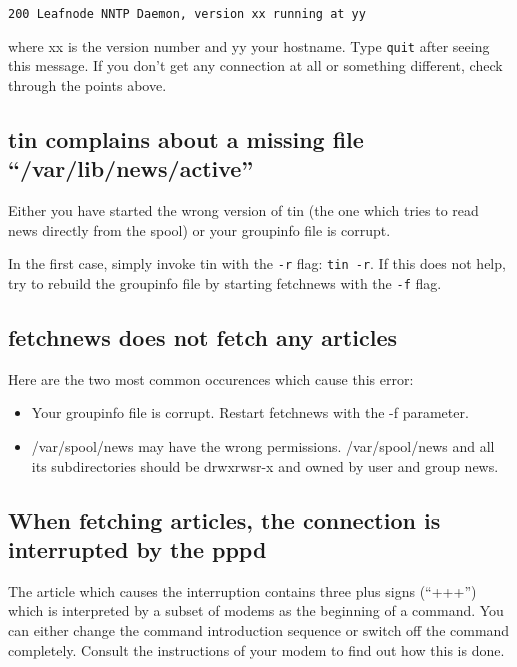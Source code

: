 \documentclass[10pt,english,a5paper]{article}
\begin{document}
   \begin{verbatim}
200 Leafnode NNTP Daemon, version xx running at yy
\end{verbatim}

   where xx is the version number and yy your hostname. Type \verb"quit" after
   seeing this message. If you don't get any connection at all or
   something different, check through the points above.


\subsection{tin complains about a missing file ``/var/lib/news/active''}

   Either you have started the wrong version of tin (the one which tries
   to read news directly from the spool) or your groupinfo file is
   corrupt.

   In the first case, simply invoke tin with the \verb+-r+ flag: \verb"tin -r". If
   this does not help, try to rebuild the groupinfo file by starting
   fetchnews with the \verb+-f+ flag.

   \subsection{fetchnews does not fetch any articles}

   Here are the two most common occurences which cause this error:
   \begin{itemize}
       \item Your groupinfo file is corrupt. Restart fetchnews with the -f
       parameter.
   \item /var/spool/news may have the wrong permissions. /var/spool/news
       and all its subdirectories should be drwxrwsr-x and owned by user
       and group news.
       \end{itemize}

\subsection{When fetching articles, the connection is interrupted by
the pppd}

   The article which causes the interruption contains three plus signs
   (``+++'') which is interpreted by a subset of modems as the beginning of
   a command. You can either change the command introduction sequence or
   switch off the command completely. Consult the instructions of your
   modem to find out how this is done.
\end{document}
